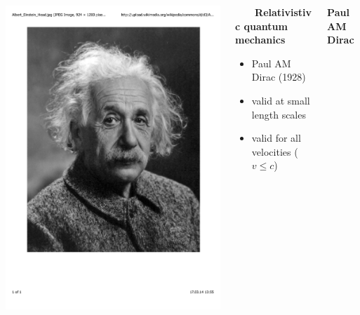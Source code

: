 \documentclass[mathserif,8pt]{beamer}
\begin{document}
\begin{frame}
\begin{columns}
\begin{column}{.30\textwidth}
	\includegraphics[viewport = 50 200 500 800, clip, scale=0.1]{figures/einstein.pdf}
    \end{column}
    \begin{column}{.40\textwidth}
    \ \ \ \ \textbf{Relativistivc quantum mechanics}
    \begin{itemize}
	\item Paul AM Dirac (1928)
	\item valid at small length scales
	\item valid for all velocities ($v \leq c$)
    \end{itemize}
    \end{column}
    \begin{column}{.30\textwidth}
	\centering
	\textbf{Paul AM Dirac}\\

\end{column}
\end{columns}
\end{frame}
\end{document}
